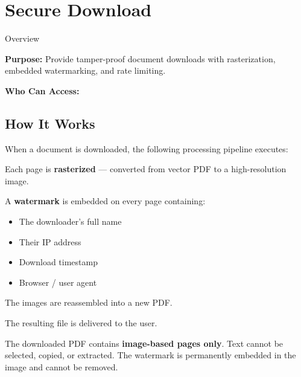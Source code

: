 \section{Secure Download}

\begin{ugModule}{Overview}

  \textbf{Purpose:}
  Provide tamper-proof document downloads with rasterization,
  embedded watermarking, and rate limiting.

  \textbf{Who Can Access:}
     
\end{ugModule}

\subsection{How It Works}

When a document is downloaded, the following processing pipeline
executes:

\begin{ugSteps}
  \item Each page is \textbf{rasterized} --- converted from
        vector PDF to a high-resolution image.
  \item A \textbf{watermark} is embedded on every page
        containing:
        \begin{itemize}[leftmargin=14pt]
          \item The downloader's full name
          \item Their IP address
          \item Download timestamp
          \item Browser / user agent
        \end{itemize}
  \item The images are reassembled into a new PDF.
  \item The resulting file is delivered to the user.
\end{ugSteps}

\begin{ugImportant}
  The downloaded PDF contains \textbf{image-based pages only}.
  Text cannot be selected, copied, or extracted. The watermark
  is permanently embedded in the image and cannot be removed.
\end{ugImportant}

